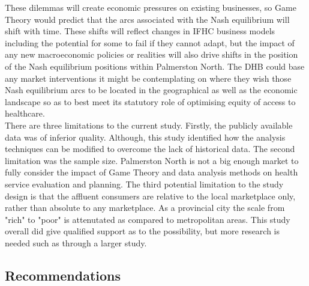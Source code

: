 \documentclass[11pt,a4paper]{article}
\begin{document}
These dilemmas will create economic pressures on existing businesses, so Game Theory would predict that the arcs associated with the Nash equilibrium will shift with time. These shifts will reflect changes in IFHC business models including the potential for some to fail if they cannot adapt, but the impact of any new macroeconomic policies or realities will also drive shifts in the position of the Nash equilibrium positions within Palmerston North. The DHB could base any market interventions it might be contemplating on where they wish those Nash equilibrium arcs to be located in the geographical as well as the economic landscape so as to best meet its statutory role of optimising equity of access to healthcare.\\


There are three limitations to the current study. Firstly, the publicly available data was of inferior quality. Although, this study identified how the analysis techniques can be modified to overcome the lack of historical data. The second limitation was the sample size. Palmerston North is not a big enough market to fully consider the impact of Game Theory and data analysis methods on health service evaluation and planning. The third potential limitation to the study design is that the affluent consumers are relative to the local marketplace only, rather than absolute to any marketplace. As a provincial city the scale from "rich" to "poor" is attenutated as compared to metropolitan areas. This study overall did give qualified support as to the possibility, but more research is needed such as through a larger study.\\


\subsection{Recommendations}
 
\end{document}
